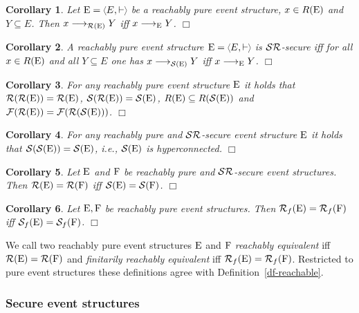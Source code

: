 \documentclass[twocolumn]{article}
\newtheorem{coro}{Corollary}
\newenvironment{corollary}[1]{\begin{coro} \rm \label{cor-#1} }{\end{coro}}
\newcommand{\df}[1]{Definition~\ref{df-#1}}
\begin{document}
\begin{corollary}{reachable transition equivalence ES}
Let $\eE=\tuple{E,\vdash\;}$ be a reachably pure event structure,
$x\in R({\rm E})$ and $Y \subseteq E$.
Then $x \stackrel{}{\longrightarrow}_{{\cal R}({\rm E})} Y$ iff $x \stackrel{}{\longrightarrow}_{\rm E} Y$.
\hfill $\Box$
\end{corollary}

\begin{corollary}{secured transition equivalence ES}
A reachably pure event structure
$\eE=\tuple{E,\vdash\;}$ is ${\cal S}{\cal R}$-secure
iff for all $x \in R({\rm E})$ and all $Y \subseteq E$ one has
$x \stackrel{}{\longrightarrow}_{{\cal S}({\rm E})} Y$ iff $x \stackrel{}{\longrightarrow}_{\rm E} Y$.
\hfill $\Box$
\end{corollary}

\begin{corollary}{ES analogies}
For any reachably pure event structure ${\rm E}$ it holds that
${\cal R}({\cal R}({\rm E}))={\cal R}({\rm E})$, ${\cal S}({\cal R}({\rm E}))={\cal S}({\rm E})$,
$R({\rm E})\subseteq R({\cal S}({\rm E}))$ and ${\cal F}({\cal R}({\rm E}))={\cal F}({\cal R}({\cal S}({\rm E})))$.
\hfill $\Box$
\end{corollary}

\begin{corollary}{ES analogies secure}
For any reachably pure and ${\cal S}{\cal R}$-secure event structure ${\rm E}$ it holds that
${\cal S}({\cal S}({\rm E}))={\cal S}({\rm E})$, i.e., ${\cal S}({\rm E})$ is hyperconnected.
\hfill $\Box$
\end{corollary}

\begin{corollary}{reachable equivalence ES}
Let ${\rm E}$ and ${\rm F}$ be reachably pure and ${\cal S}{\cal R}$-secure event structures.
Then ${\cal R}({\rm E}) = {\cal R}({\rm F})$ iff ${\cal S}({\rm E}) = {\cal S}({\rm F})$.
\hfill $\Box$
\end{corollary}

\begin{corollary}{finitary reachable equivalence ES}
Let ${\rm E},{\rm F}$ be reachably pure event structures.
Then ${\cal R}_f({\rm E}) = {\cal R}_f({\rm F})$ iff ${\cal S}_f({\rm E}) = {\cal S}_f({\rm F})$.
\hfill $\Box$
\end{corollary}
We call two reachably pure event structures ${\rm E}$ and ${\rm F}$
\emph{reachably equivalent} iff ${\cal R}({\rm E})={\cal R}({\rm F})$ and
\emph{finitarily reachably equivalent}
iff ${\cal R}_f({\rm E})={\cal R}_f({\rm F})$.  Restricted to pure event structures
these definitions agree with \df{reachable}.

\subsubsection*{Secure event structures}\label{secure}
\end{document}
